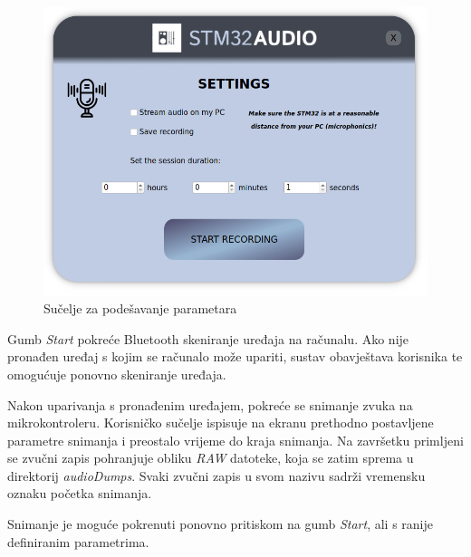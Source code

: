 \begin{figure}[ht]
	\includegraphics[width=\linewidth]{imgs/params_form}
	\caption{Sučelje za podešavanje parametara}
	\label{fig:params_form}
\end{figure}

Gumb \textit{Start} pokreće Bluetooth skeniranje uređaja na računalu. Ako nije pronađen uređaj s kojim se računalo može upariti, sustav obavještava korisnika te omogućuje ponovno skeniranje uređaja. 

Nakon uparivanja s pronađenim uređajem, pokreće se snimanje zvuka na mikrokontroleru. Korisničko sučelje ispisuje na ekranu prethodno postavljene parametre snimanja i preostalo vrijeme do kraja snimanja. Na završetku primljeni se zvučni zapis pohranjuje obliku \textit{RAW} datoteke, koja se zatim sprema u direktorij \textit{audioDumps}. Svaki zvučni zapis u svom nazivu sadrži vremensku oznaku početka snimanja. 

Snimanje je moguće pokrenuti ponovno pritiskom na gumb \textit{Start}, ali s ranije definiranim parametrima.

\vspace*{3\baselineskip}
 
